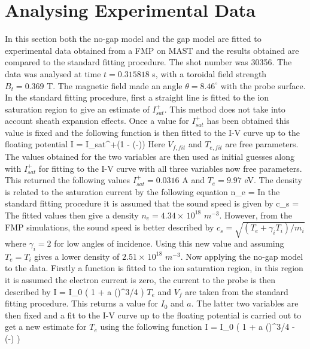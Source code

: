 \section{Analysing Experimental Data} 
In this section both the no-gap model \cite{Bergmann-2002} and the gap model are fitted to experimental data obtained from a FMP on MAST and the results obtained are compared to the standard fitting procedure. The shot number was 30356. The data was analysed at time $t = 0.315818$ s, with a  toroidal field strength $B_t = 0.369$ T. The magnetic field made an angle $\theta = 8.46 ^\circ$ with the probe surface. 
In the standard fitting procedure, first a straight line is fitted to the ion saturation region to give an estimate of $I_{sat}^+$. This method does not take into account sheath expansion effects. Once a value for $I_{sat}^+$ has been obtained this value is fixed and the following function is then fitted to the I-V curve up to the floating potential
\be
I = I_{sat}^+\left(1 - \exp\left(-\right)\right)
\ee 
Here $V_{f,fit}$ and $T_{e,fit}$ are free parameters. The values obtained for the two variables are then used as initial guesses along with $I_{sat}^+$ for fitting to the I-V curve with all three variables now free parameters. This returned the following values $I_{sat}^+ = 0.0316$ A and $T_e = 9.97$ eV. The density is related to the saturation current by the following equation 
\be 
n_e =  
\ee
In the standard fitting procedure it is assumed that the sound speed is given by 
\be 
c_s = 
\ee  
The fitted values then give a density $n_e = 4.34 \times \, 10^{18}$ $m^{-3}$. However, from the FMP simulations, the sound speed is better described by $c_s = \sqrt{(T_e + \gamma_i T_i)/m_i}$ where $\gamma_i = 2$ for low angles of incidence. Using this new value and assuming $T_e = T_i$ gives a lower density of $ 2.51 \times \, 10^{18}$ $m^{-3}$. 
Now applying the no-gap model to the data. Firstly a function is fitted to the ion saturation region, in this region it is assumed the electron current is zero, the current to the probe is then described by 
\be 
I = I_0 \left( 1 + a {\left(\right)}^{3/4} \right)
\ee
$T_e$ and $V_f$ are taken from the standard fitting procedure. This returns a value for $I_0$ and $a$. The latter two variables are then fixed and a fit to the I-V curve up to the floating potential is carried out to get a new estimate for $T_e$ using the following function 
\be 
I = I_0 \left( 1 + a {\left(\right)}^{3/4}  - \exp\left(-\right) \right)
